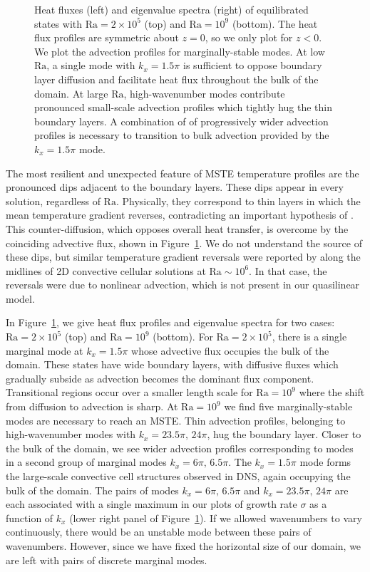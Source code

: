 \documentclass[reprint,amsmath,amssymb,aps,nofootinbib]{revtex4-1}
\newcommand\Ra{\mathrm{Ra}}
\begin{document}
\begin{figure}
\begin{tabular}{@{}c@{}}
    \end{tabular}
    \caption{Heat fluxes (left) and eigenvalue spectra (right) of equilibrated states with $\Ra = 2 \times 10^5$ (top) and $\Ra = 10^9$ (bottom). 
    The heat flux profiles are symmetric about $z=0$, so we only plot for $z<0$.
    We plot the advection profiles for marginally-stable modes. 
    At low $\Ra$, a single mode with $k_x = 1.5\pi$ is sufficient to oppose boundary layer diffusion and facilitate heat flux throughout the bulk of the domain. 
    At large $\Ra$, high-wavenumber modes contribute pronounced small-scale advection profiles which tightly hug the thin boundary layers. 
    A combination of of progressively wider advection profiles is necessary to transition to bulk advection provided by the $k_x = 1.5\pi$ mode.}
    \label{fig:flux}
\end{figure}

The most resilient and unexpected feature of MSTE temperature profiles are the pronounced dips adjacent to the boundary layers. 
These dips appear in every solution, regardless of $\Ra$. 
Physically, they correspond to thin layers in which the mean temperature gradient reverses, contradicting an important hypothesis of \cite{Malkus_1954,Howard_1966}. 
This counter-diffusion, which opposes overall heat transfer, is overcome by the coinciding advective flux, shown in Figure~\ref{fig:flux}. 
We do not understand the source of these dips, but similar temperature gradient reversals were reported by \cite{chini_cells} along the midlines of 2D convective cellular solutions at $\Ra \sim 10^6$.
In that case, the reversals were due to nonlinear advection, which is not present in our quasilinear model. 

In Figure~\ref{fig:flux}, we give heat flux profiles and eigenvalue spectra for two cases: $\Ra = 2 \times 10^5$ (top) and $\Ra = 10^9$ (bottom). 
For $\Ra = 2 \times 10^5$, there is a single marginal mode at $k_x = 1.5\pi$ whose advective flux occupies the bulk of the domain. 
These states have wide boundary layers, with diffusive fluxes which gradually subside as advection becomes the dominant flux component. 
Transitional regions occur over a smaller length scale for $\Ra = 10^9$ where the shift from diffusion to advection is sharp.
At $\Ra=10^9$ we find five marginally-stable modes are necessary to reach an MSTE.
Thin advection profiles, belonging to high-wavenumber modes with $k_x=23.5\pi, \, 24\pi$, hug the boundary layer. 
Closer to the bulk of the domain, we see wider advection profiles corresponding to modes in a second group of marginal modes $k_x = 6\pi, \, 6.5\pi$.
The $k_x = 1.5\pi$ mode forms the large-scale convective cell structures observed in DNS, again occupying the bulk of the domain.
The pairs of modes $k_x = 6\pi, \, 6.5\pi$ and $k_x=23.5\pi, \, 24\pi$ are each associated with a single maximum in our plots of growth rate $\sigma$ as a function of $k_x$ (lower right panel of Figure~\ref{fig:flux}).
If we allowed wavenumbers to vary continuously, there would be an unstable mode between these pairs of wavenumbers.
However, since we have fixed the horizontal size of our domain, we are left with pairs of discrete marginal modes.
\end{document}
